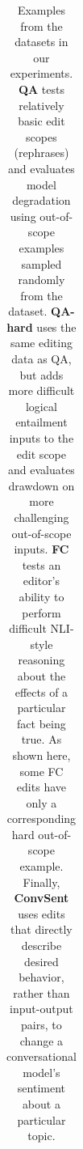 \documentclass{article}
\begin{document}
\begin{table}[t]
{\begin{tabular}{cp{7.3cm}p{6cm}p{5cm}}
        \bottomrule
    \end{tabular}}
    \caption{Examples from the datasets in our experiments. \textbf{QA} tests relatively basic edit scopes (rephrases) and evaluates model degradation using out-of-scope examples sampled randomly from the dataset. \textbf{QA-hard} uses the same editing data as QA, but adds more difficult logical entailment inputs to the edit scope and evaluates drawdown on more challenging out-of-scope inputs. \textbf{FC} tests an editor's ability to perform difficult NLI-style reasoning about the effects of a particular fact being true. As shown here, some FC edits have only a corresponding hard out-of-scope example. Finally, \textbf{ConvSent} uses edits that directly describe desired behavior, rather than input-output pairs, to change a conversational model's sentiment about a particular topic.}
    \label{tab:hard-pos-neg}
\end{table}
\end{document}
